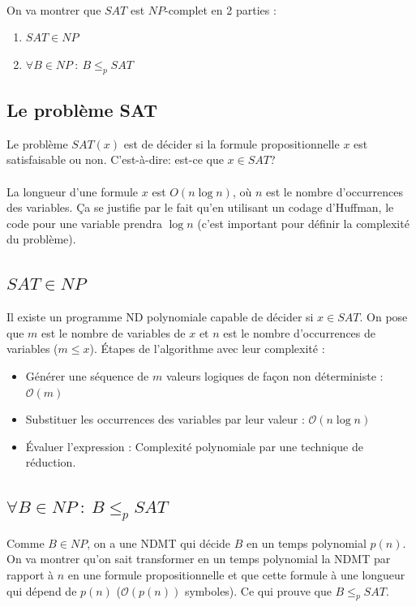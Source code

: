 \paragraph{} On va montrer que $SAT$ est $NP$-complet en 2 parties :
\begin{enumerate}
	\item $SAT \in NP$
	\item $\forall B \in NP \ : \  B\leq_p SAT $
\end{enumerate}

\subsection{Le problème SAT}
Le problème $SAT(x)$ est de décider si la formule propositionnelle $x$ est
satisfaisable ou non. C'est-à-dire: est-ce que $x\in SAT$?

\paragraph{} La longueur d'une formule $x$ est $O(n\log n)$, où $n$ est le nombre
d'occurrences des variables. Ça se justifie par le fait qu'en utilisant un codage
d'Huffman, le code pour une variable prendra $\log n$ (c'est important pour
définir la complexité du problème).

\subsection{$SAT \in NP$}
Il existe un programme ND polynomiale capable de décider si $x\in SAT$. On pose
que $m$ est le nombre de variables de $x$ et $n$ est le nombre d'occurrences de
variables ($m\leq x$). Étapes de l'algorithme avec leur complexité :
\begin{itemize}
	\item  Générer une séquence de $m$ valeurs logiques de façon
		non déterministe : $\mathcal{O}(m)$
	\item  Substituer les occurrences des variables par leur valeur :
	$\mathcal{O}(n
		\log n)$
	\item Évaluer l'expression : Complexité polynomiale par une technique
		de réduction.
\end{itemize}

\subsection{$\forall B \in NP \ : \  B\leq_p SAT $}
Comme $B \in NP$, on a une NDMT qui décide $B$ en un temps polynomial $p(n)$. On va
montrer qu'on sait transformer en un temps polynomial la NDMT par rapport à $n$
en une formule propositionnelle et que cette formule à une longueur qui dépend
de $p(n)$ ($\mathcal{O}(p(n))$ symboles). Ce qui prouve que $B \leq_p SAT$.

